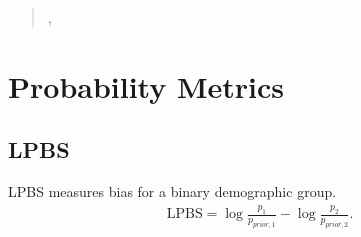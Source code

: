 \documentclass[letterpaper,10pt,english]{sphinxmanual}
\begin{document}
\begin{fulllineitems}
\begin{fulllineitems}
\begin{quote}
\begin{description}
\sphinxAtStartPar
\sphinxhref{https://docs.python.org/3/library/stdtypes.html\#dict}{dict}{[}, \sphinxhref{https://docs.python.org/3/library/functions.html\#float}{float}{]}

\end{description}\end{quote}

\end{fulllineitems}


\end{fulllineitems}



\section{Probability Metrics}
\label{\detokenize{metrics:probability-metrics}}

\subsection{LPBS}
\label{\detokenize{metrics:lpbs}}\label{\detokenize{metrics:metric-lpbs}}
\sphinxAtStartPar
LPBS  measures bias for a binary demographic group.
\begin{equation*}
\begin{split}\text{LPBS} = \log\frac{p_1}{p_{prior, 1}} - \log\frac{p_2}{p_{prior, 2}}.\end{split}
\end{equation*}
\end{document}
